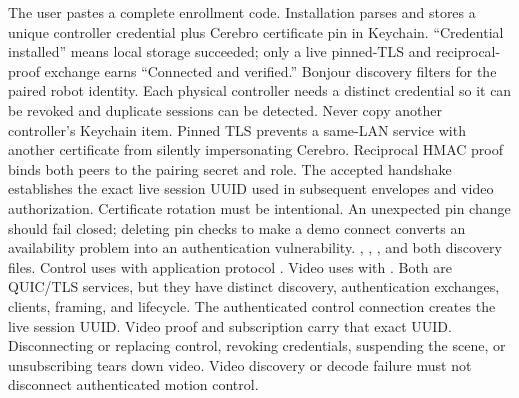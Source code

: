 {}The user pastes a complete  enrollment code. Installation parses and stores a unique controller credential plus Cerebro certificate pin in Keychain. “Credential installed” means local storage succeeded; only a live pinned-TLS and reciprocal-proof exchange earns “Connected and verified.”\markdownRendererParagraphSeparator
{}Bonjour  discovery filters for the paired robot identity. Each physical controller needs a distinct credential so it can be revoked and duplicate sessions can be detected. Never copy another controller's Keychain item.\markdownRendererParagraphSeparator
{}Pinned TLS prevents a same-LAN service with another certificate from silently impersonating Cerebro. Reciprocal HMAC proof binds both peers to the pairing secret and role. The accepted handshake establishes the exact live session UUID used in subsequent envelopes and video authorization.\markdownRendererParagraphSeparator
{}Certificate rotation must be intentional. An unexpected pin change should fail closed; deleting pin checks to make a demo connect converts an availability problem into an authentication vulnerability.\markdownRendererInterblockSeparator
{}
\markdownRendererSectionEnd \markdownRendererSectionBegin
{}\markdownRendererInterblockSeparator
{}\markdownRendererBlockQuoteBegin
{} , , , and both discovery files.\markdownRendererBlockQuoteEnd \markdownRendererInterblockSeparator
{}Control uses  with application protocol . Video uses  with . Both are QUIC/TLS services, but they have distinct discovery, authentication exchanges, clients, framing, and lifecycle.\markdownRendererParagraphSeparator
{}The authenticated control connection creates the live session UUID. Video proof and subscription carry that exact UUID. Disconnecting or replacing control, revoking credentials, suspending the scene, or unsubscribing tears down video. Video discovery or decode failure must not disconnect authenticated motion control.\markdownRendererParagraphSeparator
